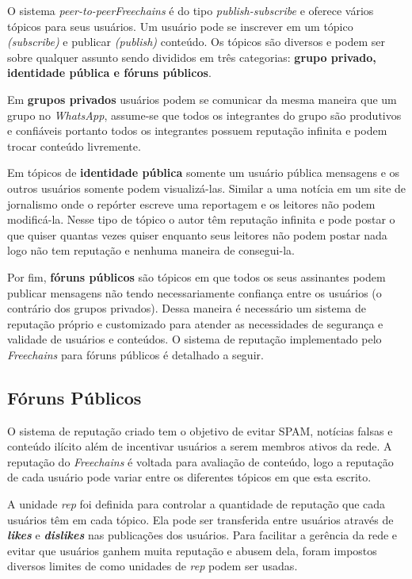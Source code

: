 \documentclass[12pt]{article}
\newcommand{\FC} {\emph{Freechains}\xspace}
\newcommand{\PtoP} {\emph{peer-to-peer}\xspace}
\begin{document}
O sistema \PtoP \FC é do tipo \emph{publish-subscribe} e oferece vários tópicos para seus usuários. Um usuário pode se inscrever em um tópico \emph{(subscribe)} e publicar \emph{(publish)} conteúdo. Os tópicos são diversos e podem ser sobre qualquer assunto sendo divididos 
em três categorias: \textbf{grupo privado, identidade pública e fóruns públicos}. 

Em \textbf{grupos privados} usuários podem se comunicar da mesma maneira que um grupo no \emph{WhatsApp}, assume-se que todos os integrantes do grupo são produtivos e confiáveis portanto todos os integrantes possuem reputação infinita e podem trocar conteúdo livremente.

Em tópicos de \textbf{identidade pública} somente um usuário pública mensagens e os outros usuários somente podem visualizá-las. Similar a uma notícia em um site de jornalismo onde o repórter escreve uma reportagem e os leitores não podem modificá-la. Nesse tipo de tópico o autor têm reputação infinita e pode postar o que quiser quantas vezes quiser enquanto seus leitores não podem postar nada logo não tem reputação e nenhuma maneira de consegui-la.

Por fim, \textbf{fóruns públicos} são tópicos em que todos os seus assinantes podem publicar mensagens não tendo necessariamente confiança entre os usuários (o contrário dos grupos privados). Dessa maneira é necessário um sistema de reputação próprio e customizado para atender as necessidades de segurança e validade de usuários e conteúdos. O sistema de reputação implementado pelo \FC para fóruns públicos é detalhado a seguir.

\subsection{Fóruns Públicos} \label{subsec: forunspub}

O sistema de reputação criado tem o objetivo de evitar SPAM, notícias falsas e conteúdo ilícito além de incentivar usuários a serem membros ativos da rede. A reputação do \FC é voltada para avaliação de conteúdo, logo a reputação de cada usuário pode variar entre os diferentes tópicos em que esta escrito. 

A unidade \emph{rep} foi definida para controlar a quantidade de reputação que cada usuários têm em cada tópico. Ela pode ser transferida entre usuários através de \textbf{\emph{likes}} e \textbf{\emph{dislikes}} nas publicações dos usuários. Para facilitar a gerência da rede e evitar que usuários ganhem muita reputação e abusem dela, foram impostos diversos limites de como unidades de \emph{rep} podem ser usadas. 
\end{document}
